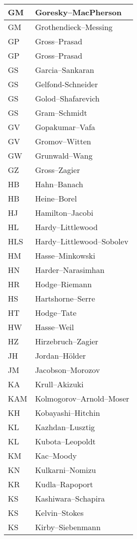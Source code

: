 \documentclass{amsart}
\numberwithin{equation}{section}
\theoremstyle{plain}
\numberwithin{equation}{section}
\theoremstyle{remark}
\begin{document}
\begin{multicols}{2}
{\begin{longtable}{l|l}
GM & Goresky--MacPherson\\ \hline
GM & Grothendieck--Messing\\ \hline
GP & Gross--Prasad\\ \hline
GP & Gross--Prasad\\ \hline
GS & Garcia--Sankaran\\ \hline
GS & Gelfond-Schneider\\ \hline
GS & Golod--Shafarevich\\ \hline
GS & Gram--Schmidt\\ \hline
GV & Gopakumar--Vafa\\ \hline
GV & Gromov--Witten\\ \hline
GW & Grunwald--Wang\\ \hline
GZ & Gross--Zagier\\ \hline
HB & Hahn--Banach\\ \hline
HB & Heine--Borel\\ \hline
HJ & Hamilton--Jacobi\\ \hline
HL & Hardy--Littlewood\\ \hline
HLS & Hardy--Littlewood--Sobolev\\ \hline
HM & Hasse--Minkowski\\ \hline
HN & Harder--Narasimhan\\ \hline
HR & Hodge--Riemann\\ \hline
HS & Hartshorne--Serre\\ \hline
HT & Hodge--Tate\\ \hline
HW & Hasse--Weil\\ \hline
HZ & Hirzebruch--Zagier\\ \hline
JH & Jordan--Hölder\\ \hline
JM & Jacobson--Morozov\\ \hline
KA & Krull--Akizuki\\ \hline
KAM & Kolmogorov--Arnold--Moser\\ \hline
KH & Kobayashi--Hitchin\\ \hline
KL & Kazhdan--Lusztig \\ \hline
KL & Kubota--Leopoldt\\ \hline
KM & Kac--Moody\\ \hline
KN & Kulkarni--Nomizu\\ \hline
KR & Kudla--Rapoport\\ \hline
KS & Kashiwara--Schapira\\ \hline
KS & Kelvin--Stokes\\ \hline
KS & Kirby--Siebenmann\\ \hline

\end{longtable}}
\end{multicols}
\end{document}
